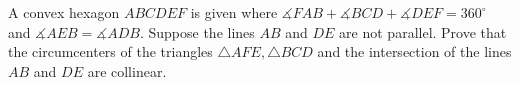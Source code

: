 A convex hexagon $ABCDEF$ is given where $ \measuredangle FAB + \measuredangle BCD + \measuredangle DEF = 360^{\circ}$ and $ \measuredangle AEB = \measuredangle ADB$. Suppose the lines $AB$ and $DE$ are not parallel. Prove that the circumcenters of the triangles $ \triangle AFE,  \triangle BCD$ and the intersection of the lines $AB$ and $DE$ are collinear.
